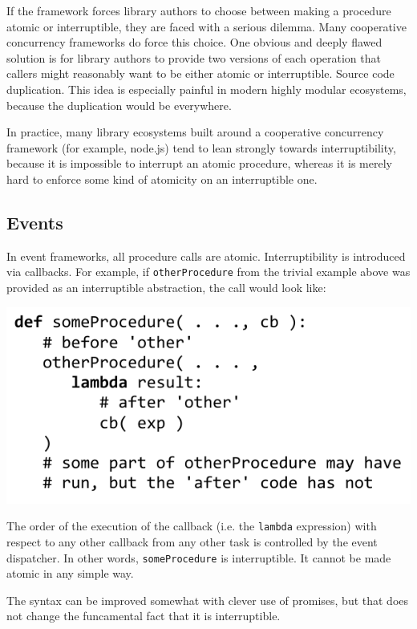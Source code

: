 \documentclass[9pt,preprint]{sigplanconf}
\begin{document}
If the framework forces library authors to choose between making a procedure atomic or interruptible, they are faced with a serious dilemma.
Many cooperative concurrency frameworks do force this choice.
One obvious and deeply flawed solution is for library authors to provide two versions of each operation that callers might reasonably want to be either atomic or interruptible.
Source code duplication.
This idea is especially painful in modern highly modular ecosystems, because the duplication would be everywhere.

In practice, many library ecosystems built around a cooperative concurrency framework (for example, node.js) tend to lean strongly towards interruptibility, because it is impossible to interrupt an atomic procedure, whereas it is merely hard to enforce some kind of atomicity on an interruptible one.

\subsection{Events}

In event frameworks, all procedure calls are atomic.
Interruptibility is introduced via callbacks.
For example, if \texttt{otherProcedure} from the trivial example above was provided as an interruptible abstraction, the call would look like:

\includegraphics[scale=0.7]{trivial_call_event}

The order of the execution of the callback (i.e. the \texttt{lambda} expression) with  respect to any other callback from any other task is controlled by the event dispatcher.
In other words, \texttt{someProcedure} is interruptible.
It cannot be made atomic in any simple way.

The syntax can be improved somewhat with clever use of promises, but that does not change the funcamental fact that it is interruptible.
\end{document}
